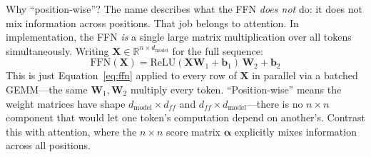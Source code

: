 Why ``position-wise''? The name describes what the FFN \emph{does not} do: it does not mix information across positions. That job belongs to attention. In implementation, the FFN \emph{is} a single large matrix multiplication over all tokens simultaneously. Writing $\mathbf{X} \in \mathbb{R}^{n \times d_{\text{model}}}$ for the full sequence:
\[
\text{FFN}(\mathbf{X}) = \text{ReLU}(\mathbf{X}\mathbf{W}_1 + \mathbf{b}_1)\,\mathbf{W}_2 + \mathbf{b}_2
\]
This is just Equation~\ref{eq:ffn} applied to every row of $\mathbf{X}$ in parallel via a batched GEMM---the same $\mathbf{W}_1, \mathbf{W}_2$ multiply every token. ``Position-wise'' means the weight matrices have shape $d_{\text{model}} \times d_{ff}$ and $d_{ff} \times d_{\text{model}}$---there is no $n \times n$ component that would let one token's computation depend on another's. Contrast this with attention, where the $n \times n$ score matrix $\boldsymbol{\alpha}$ explicitly mixes information across all positions.

